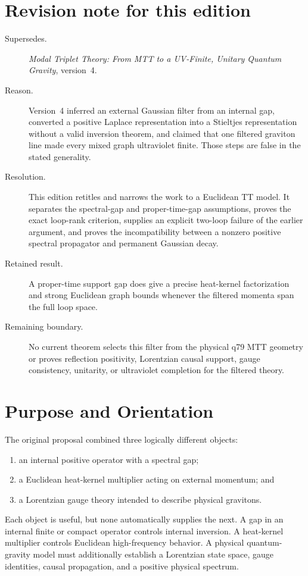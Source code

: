 \documentclass[11pt]{article}
\begin{document}
\section*{Revision note for this edition}
\begin{description}
\item[Supersedes.] \emph{Modal Triplet Theory: From MTT to a UV-Finite,
Unitary Quantum Gravity}, version~4.
\item[Reason.] Version~4 inferred an external Gaussian filter from an
internal gap, converted a positive Laplace representation into a Stieltjes
representation without a valid inversion theorem, and claimed that one
filtered graviton line made every mixed graph ultraviolet finite. Those
steps are false in the stated generality.
\item[Resolution.] This edition retitles and narrows the work to a Euclidean
TT model. It separates the spectral-gap and proper-time-gap assumptions,
proves the exact loop-rank criterion, supplies an explicit two-loop failure
of the earlier argument, and proves the incompatibility between a nonzero
positive spectral propagator and permanent Gaussian decay.
\item[Retained result.] A proper-time support gap does give a precise
heat-kernel factorization and strong Euclidean graph bounds whenever the
filtered momenta span the full loop space.
\item[Remaining boundary.] No current theorem selects this filter from the
physical q79 MTT geometry or proves reflection positivity, Lorentzian causal
support, gauge consistency, unitarity, or ultraviolet completion for the
filtered theory.
\end{description}

\tableofcontents

\section{Purpose and Orientation}

The original proposal combined three logically different objects:
\begin{enumerate}
\item an internal positive operator with a spectral gap;
\item a Euclidean heat-kernel multiplier acting on external momentum; and
\item a Lorentzian gauge theory intended to describe physical gravitons.
\end{enumerate}
Each object is useful, but none automatically supplies the next. A gap in
an internal finite or compact operator controls internal inversion. A
heat-kernel multiplier controls Euclidean high-frequency behavior. A
physical quantum-gravity model must additionally establish a Lorentzian
state space, gauge identities, causal propagation, and a positive physical
spectrum.
\end{document}
